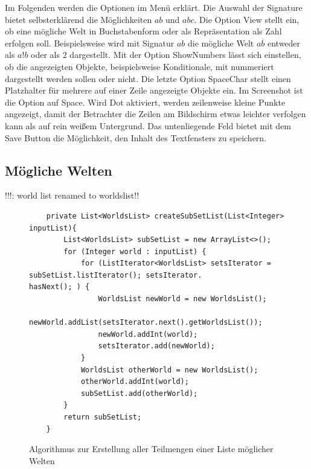 \documentclass[12pt,a4paper]{article}
\begin{document}
Im Folgenden werden die Optionen im Menü erklärt. Die Auswahl der Signature bietet selbsterklärend die Möglichkeiten $ab$ und $abc$. Die Option View stellt ein, ob eine mögliche Welt in Buchstabenform oder als Repräsentation als Zahl erfolgen soll. Beispielsweise wird mit Signatur $ab$ die mögliche Welt $a \overline{b}$ entweder als $a!b$ oder als 2 dargestellt. Mit der Option ShowNumbers lässt sich einstellen, ob die angezeigten Objekte, beispielsweise Konditionale, mit nummeriert dargestellt werden sollen oder nicht. Die letzte Option SpaceChar stellt einen Platzhalter für mehrere auf einer Zeile angezeigte Objekte ein. Im Screenshot ist die Option auf Space. Wird Dot aktiviert, werden zeilenweise kleine Punkte angezeigt, damit der Betrachter die Zeilen am Bildschirm etwas leichter verfolgen kann als auf rein weißem Untergrund. Das untenliegende Feld bietet mit dem Save Button die Möglichkeit, den Inhalt des Textfensters zu speichern.

\subsection{Mögliche Welten}
!!!: world list renamed to worldslist!!
\begin{figure}
\begin{lstlisting}
    private List<WorldsList> createSubSetList(List<Integer> inputList){
        List<WorldsList> subSetList = new ArrayList<>();
        for (Integer world : inputList) {
            for (ListIterator<WorldsList> setsIterator = subSetList.listIterator(); setsIterator.                    hasNext(); ) {
                WorldsList newWorld = new WorldsList();
                newWorld.addList(setsIterator.next().getWorldsList());
                newWorld.addInt(world);
                setsIterator.add(newWorld);
            }
            WorldsList otherWorld = new WorldsList();
            otherWorld.addInt(world);
            subSetList.add(otherWorld);
        }
        return subSetList;
    }
\end{lstlisting}
\caption{Algorithmus zur Erstellung aller Teilmengen einer Liste möglicher Welten}
\label{subsets}
\end{figure}
\end{document}
